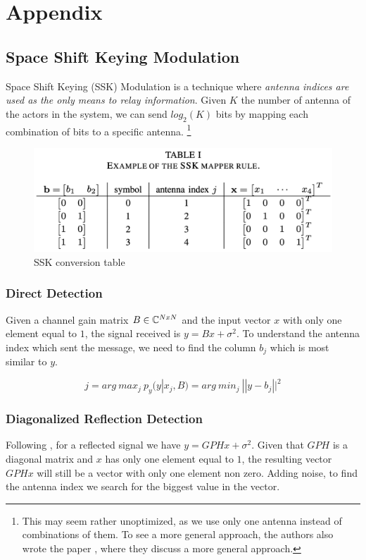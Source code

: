 \newpage
\section{Appendix}

\subsection{Space Shift Keying Modulation}
Space Shift Keying (SSK) Modulation \cite{5165332} is a technique where \textit{antenna indices are used as the only means to relay information}. Given $K$ the number of antenna of the actors in the system, we can send $log_2(K)$ bits by mapping each combination of bits to a specific antenna.
\footnote{This may seem rather unoptimized, as we use only one antenna instead of combinations of them. To see a more general approach, the authors also wrote the paper \cite{4699782}, where they discuss a more general approach.}

\begin{figure}[H]
  \centering
  \includegraphics[width=\linewidth]{imgs/ssk_conversion_table.png}
  \caption{SSK conversion table}
  \label{fig:ssk_conversion_table}
\end{figure}

\subsubsection{Direct Detection}
Given a channel gain matrix $B \in \mathbb{C}^{NxN}$ and the input vector $x$ with only one element equal to $1$, the signal received is $y = Bx + \sigma^2$. To understand the antenna index which sent the message, we need to find the column $b_j$ which is most similar to $y$.

\begin{equation}
  j = arg\ max_j\ p_y (y | x_j, B) = arg\ min_j\ || y - b_j ||^2
\end{equation}

\subsubsection{Diagonalized Reflection Detection}
Following \cite{9328149}, for a reflected signal we have $y = GPHx + \sigma^2$. Given that $GPH$ is a diagonal matrix and $x$ has only one element equal to $1$, the resulting vector $GPHx$ will still be a vector with only one element non zero. Adding noise, to find the antenna index we search for the biggest value in the vector.

